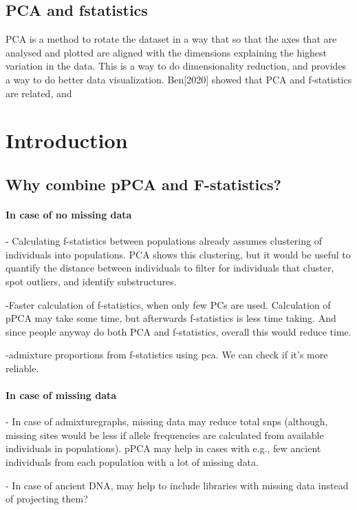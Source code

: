 \documentclass[12pt, letterpaper]{article}
\begin{document}
\subsection{PCA and fstatistics}
PCA is a method to rotate the dataset in a way that so that the axes that are analysed and plotted are aligned with the dimensions explaining the highest variation in the data. This is a way to do dimensionality reduction, and provides a way to do better data visualization. Ben[2020] showed that PCA and f-statistics are related, and   


\section{Introduction}
\subsection{Why combine pPCA and F-statistics?}

\paragraph{In case of no missing data}

- Calculating f-statistics between populations already assumes clustering of individuals into populations. PCA shows this clustering, but it would be useful to quantify the distance between individuals to filter for individuals that cluster, spot outliers, and identify substructures.

-Faster calculation of f-statistics, when only few PCs are used. Calculation of pPCA may take some time, but afterwards f-statistics is less time taking. And since people anyway do both PCA and f-statistics, overall this would reduce time.

-admixture proportions from f-statistics using pca. We can check if it's more reliable.
\paragraph{In case of missing data}

- In case of admixturegraphs, missing data may reduce total snps (although, missing sites would be less if allele frequencies are calculated from available individuals in populations). pPCA may help in cases with e.g., few ancient individuals from each population with a lot of missing data. 

- In case of ancient DNA, may help to include libraries with missing data instead of projecting them?
\newpage
\end{document}
